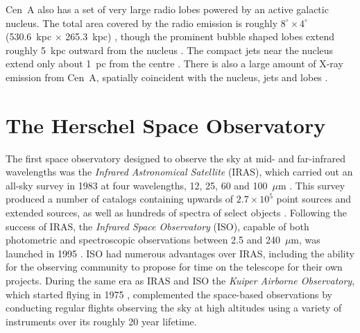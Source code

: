 Cen~A also has a set of very large radio lobes powered by an active galactic nucleus.  The total area covered by the radio emission is roughly $8^{\circ} \times 4^{\circ}$ (530.6~kpc $\times$ 265.3~kpc) \citep{1997A&AS..121...11C}, though the prominent bubble shaped lobes extend roughly 5~kpc outward from the nucleus \citep{1998A&ARv...8..237I}.  The compact jets near the nucleus extend only about 1~pc from the centre \citep{1998A&ARv...8..237I}.  There is also a large amount of X-ray emission from Cen~A, spatially coincident with the nucleus, jets and lobes \citep[e.g.][]{1997ApJ...475..118T,2009ApJ...698.2036K}.

\section{The Herschel Space Observatory} \label{herschel}
The first space observatory designed to observe the sky at mid- and far-infrared wavelengths was the \emph{Infrared Astronomical Satellite} (IRAS), which carried out an all-sky survey in 1983 at four wavelengths, 12, 25, 60 and 100~$\mu$m \citep{1984ApJ...278L...1N}.  This survey produced a number of catalogs containing upwards of $2.7 \times 10^{5}$ point sources and extended sources, as well as hundreds of spectra of select objects \citep{IRAS_supp}. Following the success of IRAS, the \emph{Infrared Space Observatory} (ISO), capable of both photometric and spectroscopic observations between 2.5 and 240~$\mu$m, was launched in 1995 \citep{1996A&A...315L..27K}.  ISO had numerous advantages over IRAS, including the ability for the observing community to propose for time on the telescope for their own projects.  During the same era as IRAS and ISO the \emph{Kuiper Airborne Observatory}, which started flying in 1975 \citep[e.g.][and references therein]{1979PASP...91..143H}, complemented the space-based observations by conducting regular flights observing the sky at high altitudes using a variety of instruments over its roughly 20 year lifetime.

